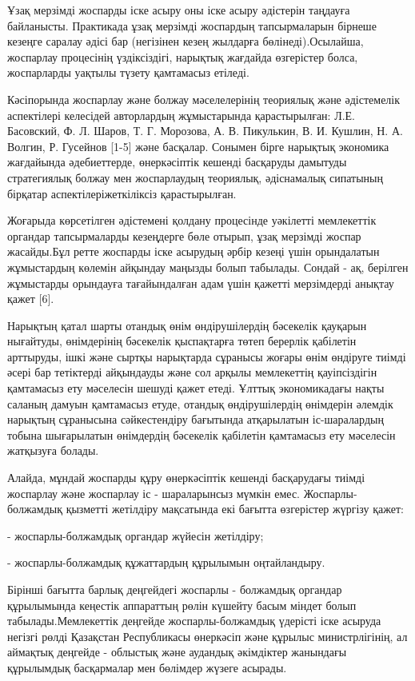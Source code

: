 \begin{multicols}{2}
Ұзақ мерзімді жоспарды іске асыру оны іске асыру әдістерін таңдауға
байланысты. Практикада ұзақ мерзімді жоспардың тапсырмаларын бірнеше
кезеңге саралау әдісі бар (негізінен кезең жылдарға бөлінеді).Осылайша,
жоспарлау процесінің үздіксіздігі, нарықтық жағдайда өзгерістер болса,
жоспарларды уақтылы түзету қамтамасыз етіледі.

Кәсіпорында жоспарлау және болжау мәселелерінің теориялық және
әдістемелік аспектілері келесідей авторлардың жұмыстарында
қарастырылған: Л.Е. Басовский, Ф. Л. Шаров, Т. Г. Морозова, А. В.
Пикулькин, В. И. Кушлин, Н. А. Волгин, Р. Гусейнов {[}1-5{]} және
басқалар. Сонымен бірге нарықтық экономика жағдайында әдебиеттерде,
өнеркәсіптік кешенді басқаруды дамытуды стратегиялық болжау мен
жоспарлаудың теориялық, әдіснамалық сипатының бірқатар
аспектілеріжеткіліксіз қарастырылған.

Жоғарыда көрсетілген әдістемені қолдану процесінде уәкілетті мемлекеттік
органдар тапсырмаларды кезеңдерге бөле отырып, ұзақ мерзімді жоспар
жасайды.Бұл ретте жоспарды іске асырудың әрбір кезеңі үшін орындалатын
жұмыстардың көлемін айқындау маңызды болып табылады. Сондай - ақ,
берілген жұмыстарды орындауға тағайындалған адам үшін қажетті
мерзімдерді анықтау қажет {[}6{]}.

Нарықтың қатал шарты отандық өнім өндірушілердің бәсекелік қауқарын
нығайтуды, өнімдерінің бәсекелік қыспақтарға төтеп берерлік қабілетін
арттыруды, ішкі және сыртқы нарықтарда сұранысы жоғары өнім өндіруге
тиімді әсері бар тетіктерді айқындауды және сол арқылы мемлекеттің
қауіпсіздігін қамтамасыз ету мәселесін шешуді қажет етеді. Ұлттық
экономикадағы нақты саланың дамуын қамтамасыз етуде, отандық
өндірушілердің өнімдерін әлемдік нарықтың сұранысына сәйкестендіру
бағытында атқарылатын іс-шаралардың тобына шығарылатын өнімдердің
бәсекелік қабілетін қамтамасыз ету мәселесін жатқызуға болады.

Алайда, мұндай жоспарды құру өнеркәсіптік кешенді басқарудағы тиімді
жоспарлау және жоспарлау іс - шараларынсыз мүмкін емес.
Жоспарлы-болжамдық қызметті жетілдіру мақсатында екі бағытта өзгерістер
жүргізу қажет:

- жоспарлы-болжамдық органдар жүйесін жетілдіру;

- жоспарлы-болжамдық құжаттардың құрылымын оңтайландыру.

Бірінші бағытта барлық деңгейдегі жоспарлы - болжамдық органдар
құрылымында кеңестік аппараттың рөлін күшейту басым міндет болып
табылады.Мемлекеттік деңгейде жоспарлы-болжамдық үдерісті іске асыруда
негізгі рөлді Қазақстан Республикасы өнеркәсіп және құрылыс
министрлігінің, ал аймақтық деңгейде - облыстық және аудандық әкімдіктер
жанындағы құрылымдық басқармалар мен бөлімдер жүзеге асырады.


\end{multicols}
